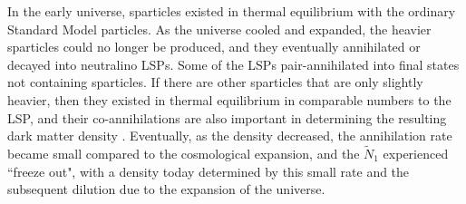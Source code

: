 \documentclass[12pt]{article}
\def\stilde{\widetilde}
\def\NI{\stilde N_1}
\begin{document}
In the early universe, sparticles existed in thermal equilibrium with the 
ordinary Standard Model particles. As the universe cooled and expanded, 
the heavier sparticles could no longer be produced, and they 
eventually annihilated or 
decayed into neutralino LSPs.  Some of the LSPs 
pair-annihilated into final states not containing sparticles. If there are 
other sparticles that are only slightly heavier, then they existed in 
thermal equilibrium in comparable numbers to the LSP, and their 
co-annihilations are also important in determining the resulting dark 
matter density \cite{GriestSeckel,Gondolo:1990dk}. Eventually, as the 
density decreased, the annihilation rate became small compared to the 
cosmological expansion, and the $\NI$ experienced ``freeze out", with a 
density today determined by this small rate and the subsequent dilution 
due to the expansion of the universe.
\end{document}
